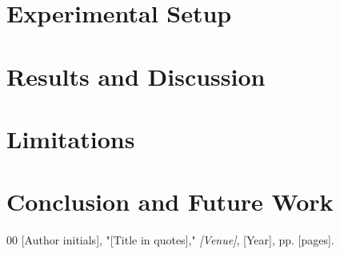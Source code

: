 \documentclass[conference]{IEEEtran}
\begin{document}
\section{Experimental Setup}

\section{Results and Discussion}

\section{Limitations}

\section{Conclusion and Future Work}

\begin{thebibliography}{00}
 [Author initials], "[Title in quotes]," \textit{[Venue]}, [Year], pp. [pages].
\end{thebibliography}
\end{document}
